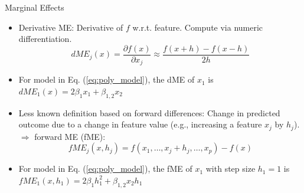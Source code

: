 \documentclass[11pt,compress,t,notes=noshow, aspectratio=169, xcolor=table]{beamer}
\begin{document}


\begin{frame}{Marginal Effects}

\begin{itemize}
\item
Derivative ME: Derivative of $f$ w.r.t. feature. Compute via numeric differentiation.
$$dME_j(x) = \frac{\partial f(x)}{\partial x_j} \approx \frac{f(x + h) - f(x - h)}{2h}$$
\item For model in Eq. (\ref{eq:poly_model}), the dME of $x_1$ is $dME_1(x) = 2\beta_1 x_1 +  \beta_{1, 2} x_2$
\item Less known definition based on forward differences: Change in predicted outcome due to a change in feature value (e.g., increasing a feature $x_j$ by $h_j$). $\Rightarrow$ forward ME (fME):
\begin{equation*}
fME_j(x, h_j) = f(x_1, \dots, x_j + h_j, \dots, x_p) - f(x)
\end{equation*}
\item For model in Eq. (\ref{eq:poly_model}), the fME of $x_1$ with step size $h_1 = 1$ is
$fME_1(x, h_1) = 2\beta_1 h_1^2 +  \beta_{1, 2} x_2 h_1$
\end{itemize}
\end{frame}


\end{document}
